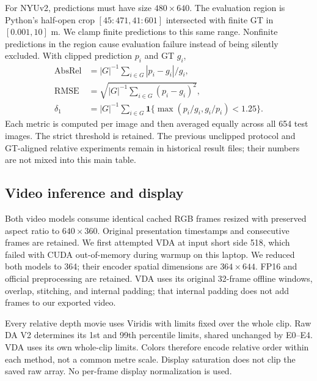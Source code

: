 For NYUv2, predictions must have size $480\times640$. The evaluation region is Python's half-open crop $[45{:}471,41{:}601]$ intersected with finite GT in $[0.001,10]$ m. We clamp finite predictions to this same range. Nonfinite predictions in the region cause evaluation failure instead of being silently excluded. With clipped prediction $p_i$ and GT $g_i$,
\begin{align}
\mathrm{AbsRel}&=|G|^{-1}\sum_{i\in G}|p_i-g_i|/g_i,\\
\mathrm{RMSE}&=\sqrt{|G|^{-1}\sum_{i\in G}(p_i-g_i)^2},\\
\delta_1&=|G|^{-1}\sum_{i\in G}\mathbf{1}\{\max(p_i/g_i,g_i/p_i)<1.25\}.
\end{align}
Each metric is computed per image and then averaged equally across all 654 test images. The strict threshold is retained. The previous unclipped protocol and GT-aligned relative experiments remain in historical result files; their numbers are not mixed into this main table.

\subsection{Video inference and display}
Both video models consume identical cached RGB frames resized with preserved aspect ratio to $640\times360$. Original presentation timestamps and consecutive frames are retained. We first attempted VDA at input short side 518, which failed with CUDA out-of-memory during warmup on this laptop. We reduced both models to 364; their encoder spatial dimensions are $364\times644$. FP16 and official preprocessing are retained. VDA uses its original 32-frame offline windows, overlap, stitching, and internal padding; that internal padding does not add frames to our exported video.

Every relative depth movie uses Viridis with limits fixed over the whole clip. Raw DA V2 determines its 1st and 99th percentile limits, shared unchanged by E0--E4. VDA uses its own whole-clip limits. Colors therefore encode relative order within each method, not a common metre scale. Display saturation does not clip the saved raw array. No per-frame display normalization is used.

